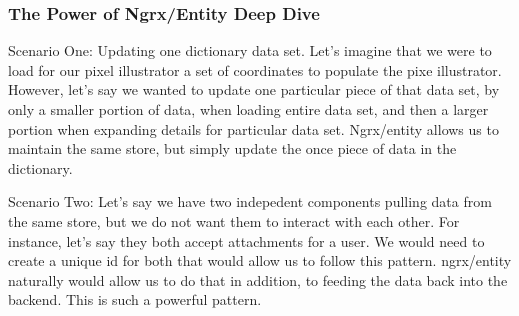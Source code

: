 \subsubsection{The Power of Ngrx/Entity Deep Dive}
Scenario One:
Updating one dictionary data set. Let's imagine that we were to load for our
pixel illustrator a set of coordinates to populate the pixe illustrator. However,
let's say we wanted to update one particular piece of that data set, by only
a smaller portion of data, when loading entire data set, and then a larger portion
when expanding details for particular data set. Ngrx/entity allows us to maintain
the same store, but simply update the once piece of data in the dictionary.

Scenario Two:
Let's say we have two indepedent components pulling data from the same store,
but we do not want them to interact with each other. For instance, let's say they
both accept attachments for a user. We would need to create a unique id for both
that would allow us to follow this pattern. ngrx/entity naturally would allow us
to do that in addition, to feeding the data back into the backend. This is such a
powerful pattern.
